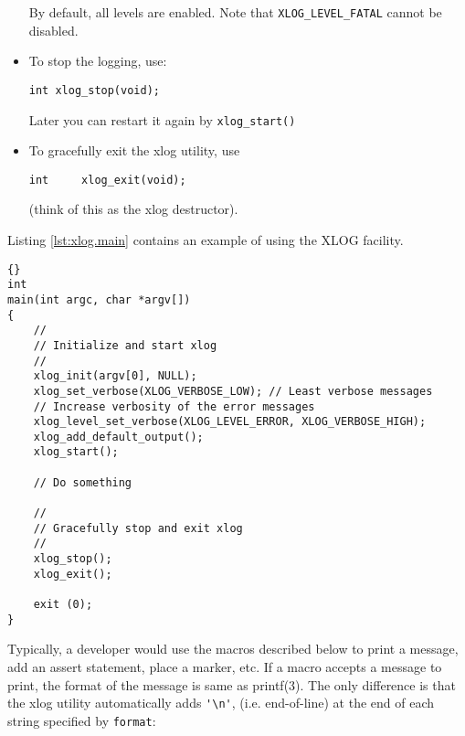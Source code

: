 \documentclass[11pt]{article}
\begin{document}
\begin{itemize}
	By default, all levels are enabled.
	Note that \verb=XLOG_LEVEL_FATAL= cannot be disabled.

  \item To stop the logging, use:

\begin{verbatim}
int xlog_stop(void);
\end{verbatim}

	Later you can restart it again by \verb=xlog_start()=

  \item To gracefully exit the xlog utility, use

\begin{verbatim}
int     xlog_exit(void);
\end{verbatim}

	(think of this as the xlog destructor).
\end{itemize}

Listing \ref{lst:xlog.main} contains an example of using the XLOG facility.

\begin{lstlisting}[caption={An example of using the XLOG facility %
                                     \label{lst:xlog.main} } ]{}
int
main(int argc, char *argv[])
{
    //
    // Initialize and start xlog
    //
    xlog_init(argv[0], NULL);
    xlog_set_verbose(XLOG_VERBOSE_LOW);	// Least verbose messages
    // Increase verbosity of the error messages
    xlog_level_set_verbose(XLOG_LEVEL_ERROR, XLOG_VERBOSE_HIGH);
    xlog_add_default_output();
    xlog_start();

    // Do something

    //
    // Gracefully stop and exit xlog
    //
    xlog_stop();
    xlog_exit();

    exit (0);
}
\end{lstlisting}

Typically, a developer would use the macros described below
to print a message, add an assert statement, place a marker, etc.
If a macro accepts a message to print, the format of the message is same
as printf(3). The only difference is that the xlog utility automatically
adds \verb='\n'=, (i.e. end-of-line) at the end of each string
specified by \verb=format=:
\end{document}
